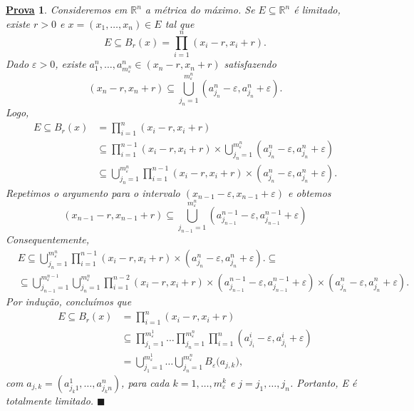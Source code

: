 \documentclass{article}
\newtheorem*{proof*}{\underline{Prova}}
\renewcommand\qedsymbol{$\blacksquare$}
\begin{document}
\begin{proof*}
  Consideremos em \(\mathbb{R}^{n}\) a métrica do máximo. Se \(E\subseteq{\mathbb{R}^{n}}\) é limitado, existe \(r > 0\) e \(x = (x_{1}, \dotsc, x_{n})\in E\) tal que 
  \[
    E\subseteq{B_{r}(x)} = \prod\limits_{i=1}^{n}(x_{i}-r, x_{i}+r).
  \]
  Dado \(\varepsilon >0\), existe \(a_{1}^{n}, \dotsc, a_{m_{\varepsilon }^{n}}^{n}\in(x_{n}-r, x_{n}+r)\) satisfazendo 
  \[
    (x_{n}-r,x_{n}+r) \subseteq{\bigcup_{j_{n}=1}^{m_{\varepsilon }^{n}}{(a_{j_{n}}^{n}-\varepsilon , a_{j_{n}}^{n}+\varepsilon )}}.
  \]
  Logo, 
 \begin{align*}
  E \subseteq{B_{r}(x)} &=\prod\limits_{i=1}^{n}(x_{i}-r, x_{i}+r)\\
                        &\subseteq{}\prod\limits_{i=1}^{n-1}(x_{i}-r, x_{i}+r)\times \bigcup_{j_{n}=1}^{m_{\varepsilon }^{n}}{(a_{j_{n}}^{n}-\varepsilon , a_{j_{n}}^{n}+\varepsilon )}\\
                        &\subseteq{\bigcup_{j_{n}=1}^{m_{\varepsilon }^{n}}\prod\limits_{i=1}^{n-1}(x_{i}-r, x_{i}+r)\times (a_{j_{n}}^{n}-\varepsilon , a_{j_{n}}^{n}+\varepsilon ).}
 \end{align*}
 Repetimos o argumento para o intervalo \((x_{n-1}-\varepsilon , x_{n-1}+\varepsilon )\) e obtemos 
  \[
    (x_{n-1}-r, x_{n-1}+r)\subseteq{\bigcup_{j_{n-1}=1}^{m_{\varepsilon }^{n}}{(a_{j_{n-1}}^{n-1}-\varepsilon, a_{j_{n-1}}^{n-1}+\varepsilon  )}}
  \]
Consequentemente,
\begin{align*}
  &E\subseteq{\bigcup_{j_{n}=1}^{m_{\varepsilon }^{n}}\prod\limits_{i=1}^{n-1}(x_{i}-r, x_{i}+r)\times (a_{j_{n}}^{n}-\varepsilon , a_{j_{n}}^{n}+\varepsilon ).}\subseteq{}\\
  &\subseteq{\bigcup_{j_{n-1}=1}^{m_{\varepsilon }^{n-1}}\bigcup_{j_{n}=1}^{m_{\varepsilon }^{n}}\prod\limits_{i=1}^{n-2}(x_{i}-r, x_{i}+r)\times(a_{j_{n-1}}^{n-1}-\varepsilon , a_{j_{n-1}}^{n-1}+\varepsilon )\times (a_{j_{n}}^{n}-\varepsilon , a_{j_{n}}^{n}+\varepsilon ).}
\end{align*}
  Por indução, concluímos que 
 \begin{align*}
  E \subseteq{B_{r}(x)} &=\prod\limits_{i=1}^{n}(x_{i}-r, x_{i}+r)\\
                        &\subseteq{}\prod\limits_{j_{1}=1}^{m_{\varepsilon }^{1}}\dotsc \prod\limits_{j_{n}=1}^{m_{\varepsilon }^{n}}\prod\limits_{i=1}^{n}(a_{j_{i}}^{i}-\varepsilon , a_{j_{i}}^{i}+\varepsilon )\\
                        &=\bigcup_{j_{1}=1}^{m_{\varepsilon }^{1}}{\dotsc}\bigcup_{j_{n}=1}^{m_{\varepsilon }^{n}}{B_{\varepsilon }(a_{j, k}}),
 \end{align*}
 com \(a_{j, k} = (a_{j_{k}1}^{1},\dotsc,a_{j_{k}n}^{n})\), para cada \(k=1, \dotsc, m_{\varepsilon }^{k}\) e \(j=j_{1},\dotsc,j_{n}\). Portanto, E é totalmente limitado. \qedsymbol
\end{proof*}
\end{document}
